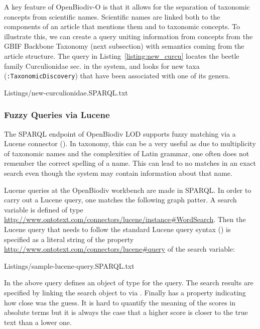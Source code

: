 A key feature of OpenBiodiv-O is that it allows for the separation of taxonomic concepts from scientific names. Scientific names are linked both to the components of an article that mentions them and to taxonomic concepts. To illustrate this, we can create a query uniting information from concepts from the GBIF Backbone Taxonomy (next subsection) with semantics coming from the article structure. The query in Listing~\ref{listing:new_curcu} locates the beetle family Curculionidae sec. \cite{gbif_secretariat_gbif_2017} in the system, and looks for new taxa ({\tt :TaxonomicDiscovery}) that have been associated with one of its genera.


{Listings/new-curculionidae.SPARQL.txt}

\subsubsection{Fuzzy Queries via Lucene}

The SPARQL endpoint of OpenBiodiv LOD supports fuzzy matching via a Lucene connector (\cite{ontotext_graphdb_2018}). In taxonomy, this can be a very useful as due to multiplicity of taxonomic names and the complexities of Latin grammar, one often does not remember the correct spelling of a name. This can lead to no matches in an exact search even though the system may contain information about that name.

Lucene queries at the OpenBiodiv workbench are made in SPARQL. In order to carry out a Lucene query, one matches the following graph patter. A search variable is defined of type \url{http://www.ontotext.com/connectors/lucene/instance#WordSearch}. Then the Lucene query that needs to follow the standard Lucene query syntax (\cite{the_apache_software_foundation_apache_2013}) is specified as a literal string of the property \url{http://www.ontotext.com/connectors/lucene#query} of the search variable:


{ Listings/sample-lucene-query.SPARQL.txt}

In the above query  defines an object of type  for the query. The search results are specified by linking the search object to  via . Finally  has a  property indicating how close was the guess. It is hard to quantify the meaning of the scores in absolute terms but it is always the case that a higher score is closer to the true text than a lower one.

